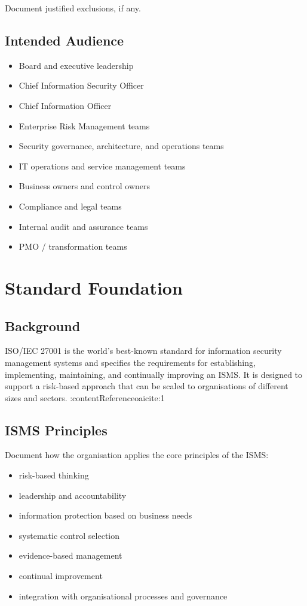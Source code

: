 \documentclass[
  letterpaper,
  DIV=11,
  numbers=noendperiod]{scrartcl}
\providecommand{\tightlist}{%
  \setlength{\itemsep}{0pt}\setlength{\parskip}{0pt}}
\begin{document}
Document justified exclusions, if any.

\subsection{Intended Audience}\label{intended-audience}

\begin{itemize}
\tightlist
\item
  Board and executive leadership
\item
  Chief Information Security Officer
\item
  Chief Information Officer
\item
  Enterprise Risk Management teams
\item
  Security governance, architecture, and operations teams
\item
  IT operations and service management teams
\item
  Business owners and control owners
\item
  Compliance and legal teams
\item
  Internal audit and assurance teams
\item
  PMO / transformation teams
\end{itemize}

\section{Standard Foundation}\label{standard-foundation}

\subsection{Background}\label{background}

ISO/IEC 27001 is the world's best-known standard for information
security management systems and specifies the requirements for
establishing, implementing, maintaining, and continually improving an
ISMS. It is designed to support a risk-based approach that can be scaled
to organisations of different sizes and sectors.
:contentReference{oaicite:1}

\subsection{ISMS Principles}\label{isms-principles}

Document how the organisation applies the core principles of the ISMS:

\begin{itemize}
\tightlist
\item
  risk-based thinking
\item
  leadership and accountability
\item
  information protection based on business needs
\item
  systematic control selection
\item
  evidence-based management
\item
  continual improvement
\item
  integration with organisational processes and governance
\end{itemize}
\end{document}
